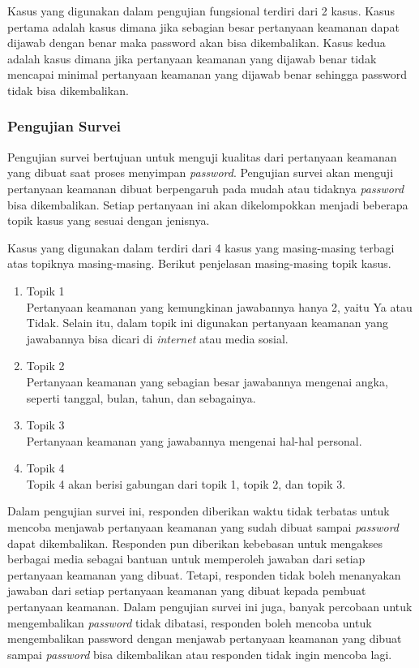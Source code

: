 Kasus yang digunakan dalam pengujian fungsional terdiri dari 2 kasus. Kasus pertama adalah kasus dimana jika sebagian besar pertanyaan keamanan dapat dijawab dengan benar maka password akan bisa dikembalikan. Kasus kedua adalah kasus dimana jika pertanyaan keamanan yang dijawab benar tidak mencapai minimal pertanyaan keamanan yang dijawab benar sehingga password tidak bisa dikembalikan.

\subsubsection{Pengujian Survei}

Pengujian survei bertujuan untuk menguji kualitas dari pertanyaan keamanan yang dibuat saat proses menyimpan \textit{password}. Pengujian survei akan menguji pertanyaan keamanan dibuat berpengaruh pada mudah atau tidaknya \textit{password} bisa dikembalikan. Setiap pertanyaan ini akan dikelompokkan menjadi beberapa topik kasus yang sesuai dengan jenisnya.

Kasus yang digunakan dalam terdiri dari 4 kasus yang masing-masing terbagi atas topiknya masing-masing. Berikut penjelasan masing-masing topik kasus.

\begin{enumerate}[itemsep=0mm]
	\item Topik 1 \\
	Pertanyaan keamanan yang kemungkinan jawabannya hanya 2, yaitu Ya atau Tidak. Selain itu, dalam topik ini digunakan pertanyaan keamanan yang jawabannya bisa dicari di \textit{internet} atau media sosial.
	\item Topik 2 \\
	Pertanyaan keamanan yang sebagian besar jawabannya mengenai angka, seperti tanggal, bulan, tahun, dan sebagainya.
	\item Topik 3 \\
	Pertanyaan keamanan yang jawabannya mengenai hal-hal personal.
	\item Topik 4 \\
	Topik 4 akan berisi gabungan dari topik 1, topik 2, dan topik 3.
\end{enumerate}

Dalam pengujian survei ini, responden diberikan waktu tidak terbatas untuk mencoba menjawab pertanyaan keamanan yang sudah dibuat sampai \textit{password} dapat dikembalikan. Responden pun diberikan kebebasan untuk mengakses berbagai media sebagai bantuan untuk memperoleh jawaban dari setiap pertanyaan keamanan yang dibuat. Tetapi, responden tidak boleh menanyakan jawaban dari setiap pertanyaan keamanan yang dibuat kepada pembuat pertanyaan keamanan. Dalam pengujian survei ini juga, banyak percobaan untuk mengembalikan \textit{password} tidak dibatasi, responden boleh mencoba untuk mengembalikan password dengan menjawab pertanyaan keamanan yang dibuat sampai \textit{password} bisa dikembalikan atau responden tidak ingin mencoba lagi.

